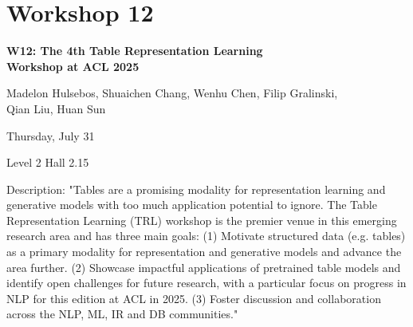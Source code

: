 \clearpage



\section[W12: The 4th Table Representation Learning Workshop at ACL 2025]{Workshop 12}
\label{workshop_12}

\begin{center}
    {\Large \textbf{W12: The 4th Table Representation Learning \\
    Workshop at ACL 2025}}\\
    
 \vspace{5mm}

   Madelon Hulsebos, Shuaichen Chang, Wenhu Chen, Filip Gralinski, \\
   Qian Liu, Huan Sun\\

    \vspace{5mm}

    Thursday, July 31
    
   Level 2 Hall 2.15

\end{center}

Description: "Tables are a promising modality for representation learning and generative models with too much application potential to ignore. The Table Representation Learning (TRL) workshop is the premier venue in this emerging research area and has three main goals:
(1) Motivate structured data (e.g. tables) as a primary modality for representation and generative models and advance the area further.
(2) Showcase impactful applications of pretrained table models and identify open challenges for future research, with a particular focus on progress in NLP for this edition at ACL in 2025.
(3) Foster discussion and collaboration across the NLP, ML, IR and DB communities."


